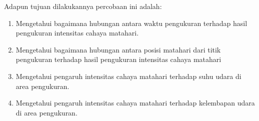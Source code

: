 Adapun tujuan dilakukannya percobaan ini adalah:
\begin{enumerate}
    \item Mengetahui bagaimana hubungan antara waktu pengukuran terhadap hasil pengukuran intensitas cahaya matahari.
    \item Mengetahui bagaimana hubungan antara posisi matahari dari titik pengukuran terhadap hasil pengukuran intensitas cahaya matahari
    \item Mengetahui pengaruh intensitas cahaya matahari terhadap suhu udara di area pengukuran.
    \item Mengetahui pengaruh intensitas cahaya matahari terhadap kelembapan udara di area pengukuran.
\end{enumerate}